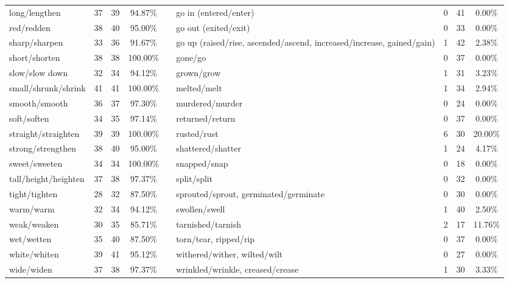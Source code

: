 \begin{tabular}{p{3cm}ccccp{3cm}ccc}
long/lengthen & 37 & 39 & 94.87\% & & go in (entered/enter) & 0 & 41 & 0.00\% \\
red/redden & 38 & 40 & 95.00\% & & go out (exited/exit) & 0 & 33 & 0.00\% \\
sharp/sharpen & 33 & 36 & 91.67\% & & go up (raised/rise, ascended/ascend, increased/increase, gained/gain) & 1 & 42 & 2.38\% \\
short/shorten & 38 & 38 & 100.00\% & & gone/go & 0 & 37 & 0.00\% \\
slow/slow down & 32 & 34 & 94.12\% & & grown/grow & 1 & 31 & 3.23\% \\
small/shrunk/shrink & 41 & 41 & 100.00\% & & melted/melt & 1 & 34 & 2.94\% \\
smooth/smooth & 36 & 37 & 97.30\% & & murdered/murder & 0 & 24 & 0.00\% \\
soft/soften & 34 & 35 & 97.14\% & & returned/return & 0 & 37 & 0.00\% \\
straight/straighten & 39 & 39 & 100.00\% & & rusted/rust & 6 & 30 & 20.00\% \\
strong/strengthen & 38 & 40 & 95.00\% & & shattered/shatter & 1 & 24 & 4.17\% \\
sweet/sweeten & 34 & 34 & 100.00\% & & snapped/snap & 0 & 18 & 0.00\% \\
tall/height/heighten & 37 & 38 & 97.37\% & & split/split & 0 & 32 & 0.00\% \\
tight/tighten & 28 & 32 & 87.50\% & & sprouted/sprout, germinated/germinate & 0 & 30 & 0.00\% \\
warm/warm & 32 & 34 & 94.12\% & & swollen/swell & 1 & 40 & 2.50\% \\
weak/weaken & 30 & 35 & 85.71\% & & tarnished/tarnish & 2 & 17 & 11.76\% \\
wet/wetten & 35 & 40 & 87.50\% & & torn/tear, ripped/rip & 0 & 37 & 0.00\% \\
white/whiten & 39 & 41 & 95.12\% & & withered/wither, wilted/wilt & 0 & 27 & 0.00\% \\
wide/widen & 37 & 38 & 97.37\% & & wrinkled/wrinkle, creased/crease & 1 & 30 & 3.33\%
\end{tabular}